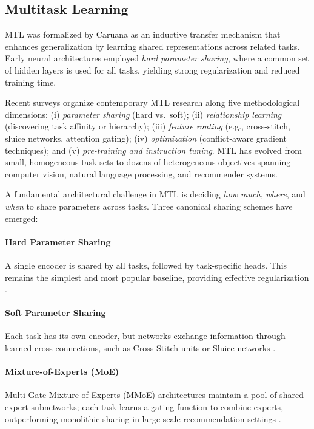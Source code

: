\subsection{Multitask Learning}
\label{sec:cbic:mtl}

MTL was formalized by Caruana \cite{caruana1997multitask} as an inductive transfer mechanism that enhances generalization by learning shared representations across related tasks. Early neural architectures employed \emph{hard parameter sharing}, where a common set of hidden layers is used for all tasks, yielding strong regularization and reduced training time.

Recent surveys \cite{yu2024survey,zhang2021survey} organize contemporary MTL research along five methodological dimensions: (i) \textit{parameter sharing} (hard vs.\ soft); (ii) \textit{relationship learning} (discovering task affinity or hierarchy); (iii) \textit{feature routing} (e.g., cross-stitch, sluice networks, attention gating); (iv) \textit{optimization} (conflict-aware gradient techniques); and (v) \textit{pre-training and instruction tuning}. MTL has evolved from small, homogeneous task sets to dozens of heterogeneous objectives spanning computer vision, natural language processing, and recommender systems.

A fundamental architectural challenge in MTL is deciding \emph{how much}, \emph{where}, and \emph{when} to share parameters across tasks. Three canonical sharing schemes have emerged:

\paragraph*{Hard Parameter Sharing}
A single encoder is shared by all tasks, followed by task-specific heads. This remains the simplest and most popular baseline, providing effective regularization \cite{caruana1997multitask}.
\paragraph*{Soft Parameter Sharing}
Each task has its own encoder, but networks exchange information through learned cross-connections, such as Cross-Stitch units \cite{misra2016cross} or Sluice networks \cite{ruder2017sluice}.
\paragraph*{Mixture-of-Experts (MoE)}
Multi-Gate Mixture-of-Experts (MMoE) architectures maintain a pool of shared expert subnetworks; each task learns a gating function to combine experts, outperforming monolithic sharing in large-scale recommendation settings \cite{ma2018mmoe}.

